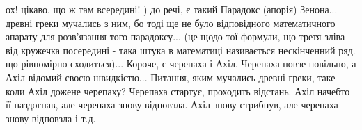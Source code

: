  
 
 
 
 

ох! цікаво, що ж там всередині! ) до речі, є такий Парадокс (апорія) Зенона...
древні греки мучались з ним, бо тоді ще не було відповідного математичного
апарату для розв'язання того парадоксу... (це щодо тої формули, що третя зліва
від кружечка посередині - така штука в математиці називається нескінченний ряд.
що рівномірно сходиться)... Короче, є черепаха і Ахіл. Черепаха повзе повільно,
а Ахіл відомий своєю швидкістю... Питання, яким мучались древні греки, таке -
коли Ахіл дожене черепаху?  Черепаха стартує, проходить відстань. Ахіл начебто
її наздогнав, але черепаха знову відповзла. Ахіл знову стрибнув, але черепаха
знову відповзла і т.д. 
